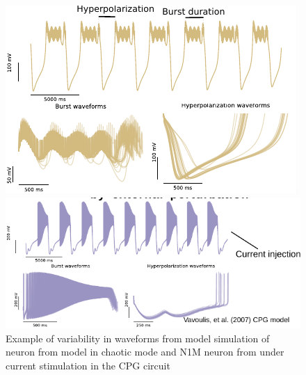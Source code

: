 \begin{figure}[hbt]
	\centering
	\begin{minipage}{0.45\textwidth}
		\includegraphics[width=\textwidth]{img/invariants/variability/TN-burst_variability.pdf}
	\end{minipage}
	\begin{minipage}{0.45\textwidth}
		\includegraphics[width=\textwidth]{img/invariants/variability/n1m_vav_burst_variability.pdf}
	\end{minipage}
	\caption{Example of variability in waveforms from model simulation of neuron from \cite{nowotny_probing_2008} model in chaotic mode and N1M neuron from \cite{vavoulis_dynamic_2007} under current stimulation in the CPG circuit}
	\label{fig:model burst variability}
\end{figure}


